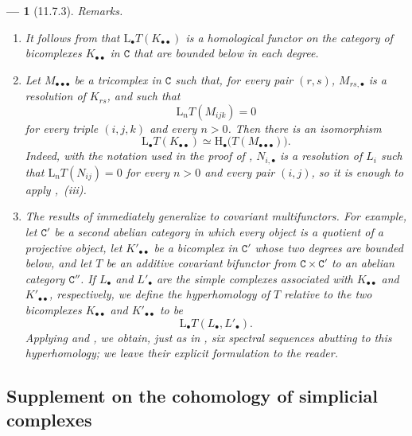 \documentclass[oneside]{amsart}
\theoremstyle{ega-env-style}
\newtheorem*{env}{---}
\theoremstyle{ega-thm-env-style}
\theoremstyle{ega-defn-env-style}
\def\cat{\mathtt}                   %
\def\HH{\mathrm{H}}                 %
\def\LL{\mathrm{L}}                 %
\def\isoto{\simeq} %
\newcommand{\oldpage}[2][]{{\marginnote{\normalfont{\textbf{#1}~|~#2}}}\ignorespaces}
\let\EGAOriginalLabel\label
\renewcommand{\label}[1]{\phantomsection\EGAOriginalLabel{#1}}
\begin{document}
\begin{env}[11.7.3]
\label{0.11.7.3}
\emph{Remarks}.
\begin{enumerate}
  \item[{\rm(i)}]
  It follows from  that
  $\LL_\bullet T(K_{\bullet\bullet})$ is a homological functor on the
  category of bicomplexes $K_{\bullet\bullet}$ in $\cat{C}$ that are
  bounded below in each degree.

\oldpage[0\textsubscript{III}]{43}
  \item[{\rm(ii)}]
  Let $M_{\bullet\bullet\bullet}$ be a tricomplex in $\cat{C}$ such that,
  for every pair $(r,s)$, $M_{rs,\bullet}$ is a resolution of $K_{rs}$,
  and such that
  \[
    \LL_nT(M_{ijk})=0
  \]
  for every triple $(i,j,k)$ and every $n>0$.
  Then there is an isomorphism
  \[
    \LL_\bullet T(K_{\bullet\bullet})
    \isoto
    \HH_\bullet\bigl(T(M_{\bullet\bullet\bullet})\bigr).
  \]
  Indeed, with the notation used in the proof of ,
  $N_{i,\bullet}$ is a resolution of $L_i$ such that
  $\LL_nT(N_{ij})=0$ for every $n>0$ and every pair $(i,j)$, so it is
  enough to apply ,~(iii).

  \item[{\rm(iii)}]
  The results of  immediately generalize to covariant
  multifunctors.
  For example, let $\cat{C}'$ be a second abelian category in which every
  object is a quotient of a projective object, let
  $K'_{\bullet\bullet}$ be a bicomplex in $\cat{C}'$ whose two degrees are
  bounded below, and let $T$ be an additive covariant bifunctor from
  $\cat{C}\times\cat{C}'$ to an abelian category $\cat{C}''$.
  If $L_\bullet$ and $L'_\bullet$ are the simple complexes associated with
  $K_{\bullet\bullet}$ and $K'_{\bullet\bullet}$, respectively, we define
  the hyperhomology of $T$ relative to the two bicomplexes
  $K_{\bullet\bullet}$ and $K'_{\bullet\bullet}$ to be
  \[
    \LL_\bullet T(L_\bullet,L'_\bullet).
  \]
  Applying  and , we obtain, just as in
  , six spectral sequences abutting to this hyperhomology;
  we leave their explicit formulation to the reader.
\end{enumerate}
\end{env}

\subsection{Supplement on the cohomology of simplicial complexes}
\label{subsection:0.11.8}
\end{document}
